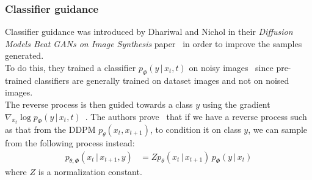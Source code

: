 \documentclass[twoside]{article}
\numberwithin{equation}{section}
\numberwithin{figure}{section}
\begin{document}
\subsubsection{Classifier guidance}
Classifier guidance was introduced by Dhariwal and Nichol in their \textit{Diffusion Models Beat GANs on Image Synthesis} paper~\cite{dhariwal2021diffusion} in order to improve the samples generated. \\
To do this, they trained a classifier $p_\Phi (y \, | \, x_t, t)$ on noisy images~\cite{dhariwal2021diffusion} since pre-trained classifiers are generally trained on dataset images and not on noised images. \\
The reverse process is then guided towards a class $y$ using the gradient $\nabla_{x_t} \log p_\Phi (y \, | \, x_t, t)$~\cite{dhariwal2021diffusion}.
The authors prove~\cite{dhariwal2021diffusion} that if we have a reverse process such as that from the DDPM $p_\theta (x_t, x_{t+1})$, to condition it on class $y$, we can sample from the following process instead:
\begin{align}
  p_{\theta, \Phi} (x_t \, | \, x_{t+1}, y) &= Z p_\theta (x_t \, | \, x_{t+1}) \, p_\Phi(y \, | \, x_t)
\end{align}
where $Z$ is a normalization constant.
\end{document}
